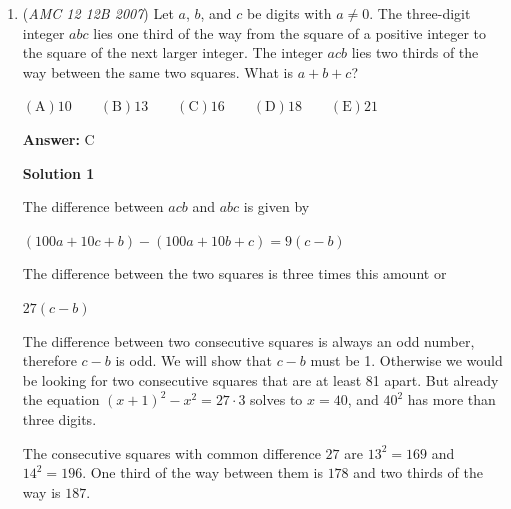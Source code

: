 \begin{enumerate}
 This puts $a$ as the smallest in the set since it must be negative.

 Checking the new equation: $-b^2 = \log_{10}b$

 Near $b=0$, $-b^2 > \log_{10} b$ but at $b=1$, $-b^2 < \log_{10} b$

 This implies that the solution occurs somewhere in between: $0 < b < 1$

 This also implies that $\frac{1}{b} > 1$

 This makes our set (ordered)$\{a,0,b,1,1/b\}$

 The median is $b \Rightarrow \mathrm {(D)}$




\textbf{Solution 2}

Let $b=0.1$. Then $a\cdot0.01 = -1,$ giving $a=-100$. Then the ordered set is $\{-100, 0, 0.1, 1, 10\}$ and the median is $0.1=b,$ so the answer is $\mathrm {(D)}$.

 


	\item (\textit{AMC 12 12B 2007}) Let $a$, $b$, and $c$ be digits with $a\ne 0$. The three-digit integer $abc$ lies one third of the way from the square of a positive integer to the square of the next larger integer. The integer $acb$ lies two thirds of the way between the same two squares. What is $a+b+c$?


 $\mathrm {(A)} 10\qquad \mathrm {(B)} 13\qquad \mathrm {(C)} 16\qquad \mathrm {(D)} 18\qquad \mathrm {(E)} 21$

 \textbf{Answer: }C



\textbf{Solution 1}

The difference between $acb$ and $abc$ is given by

 $(100a + 10c + b) - (100a + 10b + c) = 9(c-b)$

 The difference between the two squares is three times this amount or

 $27(c-b)$

 The difference between two consecutive squares is always an odd number, therefore $c-b$ is odd. We will show that $c-b$ must be 1. Otherwise we would be looking for two consecutive squares that are at least 81 apart. But already the equation $(x+1)^2-x^2 = 27\cdot 3$ solves to $x=40$, and $40^2$ has more than three digits.

 The consecutive squares with common difference $27$ are $13^2=169$ and $14^2=196$. One third of the way between them is $178$ and two thirds of the way is $187$.


\end{enumerate}
